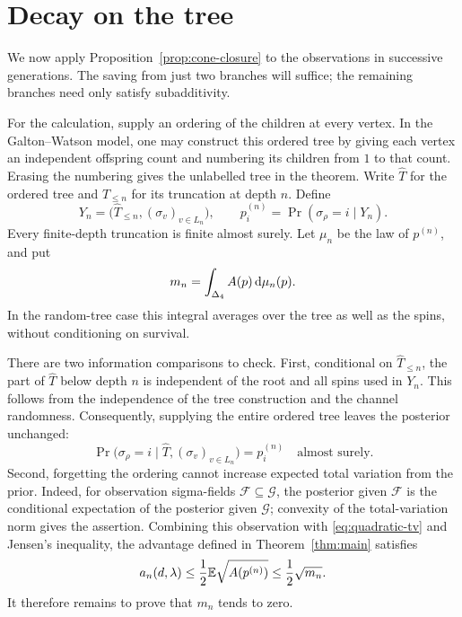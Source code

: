 \section{Decay on the tree}
\label{sec:tree-decay}

We now apply Proposition~\ref{prop:cone-closure} to the observations in
successive generations.  The saving from just two branches will suffice;
the remaining branches need only satisfy subadditivity.

For the calculation, supply an ordering of the children at every vertex.
In the Galton--Watson model, one may construct this ordered tree by giving
each vertex an independent offspring count and numbering its children
from $1$ to that count.  Erasing the numbering gives the unlabelled tree
in the theorem.  Write $\widehat T$ for the ordered tree and
$\widehat T_{\le n}$ for its truncation at depth $n$.  Define
\[
  Y_n=\bigl(\widehat T_{\le n},(\sigma_v)_{v\in L_n}\bigr),
  \qquad p^{(n)}_i=\Pr(\sigma_\rho=i\mid Y_n).
\]
Every finite-depth truncation is finite almost surely.  Let $\mu_n$ be
the law of $p^{(n)}$, and put
\begin{equation}
  m_n=\int_{\Delta_4}A(p)\,\mathrm d\mu_n(p).
  \label{eq:tree-moment}
\end{equation}
In the random-tree case this integral averages over the tree as well as
the spins, without conditioning on survival.

There are two information comparisons to check.  First, conditional on
$\widehat T_{\le n}$, the part of $\widehat T$ below depth $n$ is
independent of the root and all spins used in $Y_n$.  This follows from
the independence of the tree construction and the channel randomness.
Consequently, supplying the entire ordered tree leaves the posterior
unchanged:
\begin{equation}
  \Pr\bigl(\sigma_\rho=i\mid
       \widehat T,(\sigma_v)_{v\in L_n}\bigr)=p^{(n)}_i
  \quad\text{almost surely}.
  \label{eq:whole-tree-posterior}
\end{equation}
Second, forgetting the ordering cannot increase expected total variation
from the prior.  Indeed, for observation sigma-fields
$\mathcal F\subseteq\mathcal G$, the posterior given $\mathcal F$ is
the conditional expectation of the posterior given $\mathcal G$;
convexity of the total-variation norm gives the assertion.  Combining
this observation with \eqref{eq:quadratic-tv} and Jensen's inequality,
the advantage defined in Theorem~\ref{thm:main} satisfies
\begin{equation}
  a_n(d,\lambda)\le\frac12\mathbb E\sqrt{A(p^{(n)})}
  \le\frac12\sqrt{m_n}.
  \label{eq:tree-tv-bound}
\end{equation}
It therefore remains to prove that $m_n$ tends to zero.


